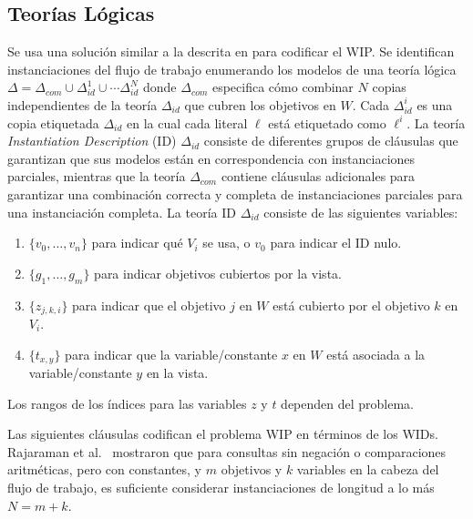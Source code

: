 \subsection{Teorías Lógicas}

Se usa una solución similar a la descrita en
\cite{arvelo:aaai06} para codificar el WIP. 
Se identifican instanciaciones del flujo de trabajo enumerando los modelos de
una teoría lógica
$\Delta=\Delta_{com}\cup\Delta_{id}^1\cup\cdots\Delta_{id}^N$
donde $\Delta_{com}$ especifica cómo combinar $N$ copias independientes de la teoría
$\Delta_{id}$ que cubren los objetivos en $W$.
Cada $\Delta^i_{id}$ es una copia etiquetada $\Delta_{id}$ en la cual cada
literal 
$\ell$ está etiquetado como $\ell^i$.
La teoría \emph{Instantiation Description} (ID) $\Delta_{id}$ consiste de
diferentes grupos de cláusulas que garantizan que sus modelos están en
correspondencia con instanciaciones parciales, mientras que la teoría
$\Delta_{com}$ contiene cláusulas adicionales para garantizar una combinación
correcta y completa de instanciaciones parciales para una instanciación
completa.
La teoría ID $\Delta_{id}$ consiste de las siguientes variables:

\begin{enumerate}[--]
\item $\{v_0,\ldots,v_n\}$ para indicar qué $V_i$ se usa, o $v_0$ para indicar el ID nulo.
\item $\{g_1,\ldots,g_m\}$ para indicar objetivos cubiertos por la vista.
\item $\{z_{j,k,i}\}$ para indicar que el objetivo $j$ en $W$ está cubierto por el objetivo $k$ en $V_i$.
\item $\{t_{x,y}\}$ para indicar que la variable/constante $x$ en $W$ está asociada a la variable/constante $y$ en la vista.
\end{enumerate}

Los rangos de los índices para las variables $z$ y $t$ dependen del problema.

Las siguientes cláusulas codifican el problema WIP en términos de los WIDs.
Rajaraman et al.\ \cite{RajaramanSU95} mostraron que para consultas sin negación
o comparaciones aritméticas, pero con constantes, y $m$ objetivos y $k$
variables en la cabeza del flujo de trabajo, es suficiente considerar
instanciaciones de longitud a lo más $N=m+k$.

